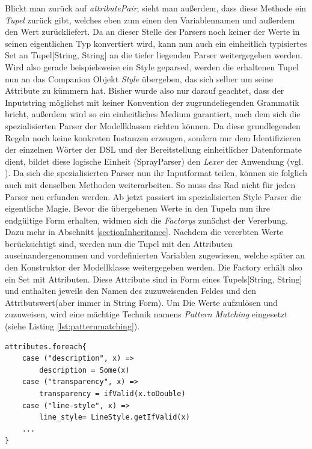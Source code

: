 Blickt man zurück auf \textit{attributePair}, sieht man außerdem, dass diese Methode ein \textit{Tupel} zurück gibt, welches eben zum einen den Variablennamen und außerdem den Wert zurückliefert.
Da an dieser Stelle des Parsers noch keiner der Werte in seinen eigentlichen Typ konvertiert wird, kann nun auch ein einheitlich typisiertes Set an Tupel[String, String] an die tiefer liegenden Parser weitergegeben werden.
Wird also gerade beispielsweise ein Style geparsed, werden die erhaltenen Tupel nun an das Companion Objekt \textit{Style} übergeben, das sich selber um seine Attribute zu kümmern hat.
Bisher wurde also nur darauf geachtet, dass der Inputstring möglichst mit keiner Konvention der zugrundeliegenden Grammatik bricht, außerdem wird so ein einheitliches Medium garantiert, nach dem sich die spezialisierten Parser der Modellklassen richten können. Da diese grundlegenden Regeln noch keine konkreten Instanzen erzeugen, sondern nur dem Identifizieren der einzelnen Wörter der DSL und der Bereitstellung einheitlicher Datenformate dient, bildet diese logische Einheit (SprayParser) den \textit{Lexer} der Anwendung (vgl. ).
Da sich die spezialisierten Parser nun ihr Inputformat teilen, können sie folglich auch mit denselben Methoden weiterarbeiten.
So muss das Rad nicht für jeden Parser neu erfunden werden.
Ab jetzt passiert im spezialisierten Style Parser die eigentliche Magie.
Bevor die übergebenen Werte in den Tupeln nun ihre endgültige Form erhalten, widmen sich die \textit{Factorys} zunächst der Vererbung. Dazu mehr in Abschnitt \ref{sectionInheritance}.
Nachdem die vererbten Werte berücksichtigt sind, werden nun die Tupel mit den Attributen auseinandergenommen und vordefinierten Variablen zugewiesen, welche später an den Konstruktor der Modellklasse weitergegeben werden.
Die Factory erhält also ein Set mit Attributen. Diese Attribute sind in Form eines Tupels[String, String] und enthalten jeweils den Namen des zuzuweisenden Feldes und den Attributswert(aber immer in String Form). Um Die Werte aufzulösen und zuzuweisen, wird eine mächtige Technik namens \textit{Pattern Matching} eingesetzt (siehe Listing \ref{lst:patternmatching}).
\begin{lstlisting}[style=scala, caption = {Auszug aus dem Code zum Pattern Matching}, label = {lst:patternmatching}]
attributes.foreach{
    case ("description", x) => 
    	description = Some(x)
    case ("transparency", x) => 
    	transparency = ifValid(x.toDouble)
    case ("line-style", x) => 
    	line_style= LineStyle.getIfValid(x)
    ...
}
\end{lstlisting}

